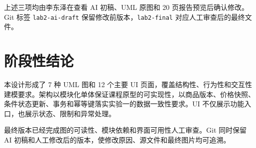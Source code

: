 \documentclass[12pt,a4paper]{ctexart}
\begin{document}
上述三项均由李东泽在查看 AI 初稿、UML 原图和 20 页报告预览后确认修改。Git 标签 \texttt{lab2-ai-draft} 保留修改前版本，\texttt{lab2-final} 对应人工审查后的最终文件。

\section{阶段性结论}

本设计形成了 7 种 UML 图和 12 个主要 UI 页面，覆盖结构性、行为性和交互性建模要求。架构以模块化单体保证课程原型的可实现性，以商品版本、价格快照、条件状态更新、事务和幂等键落实实验一的数据一致性要求。UI 不仅展示功能入口，也展示状态、限制和异常处理。

最终版本已经完成图的可读性、模块依赖和界面可用性人工审查。Git 同时保留 AI 初稿和人工修改后的版本，使修改原因、源文件和最终图片均可追溯。
\end{document}
